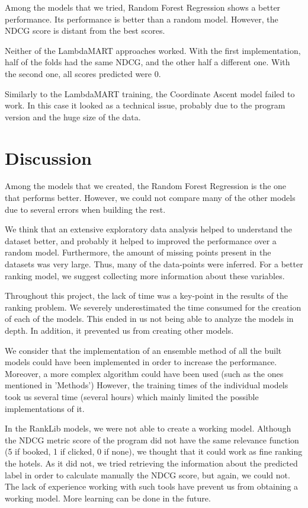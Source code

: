 \documentclass[9pt]{llncs}
\begin{document}
Among the models that we tried, Random Forest Regression shows a better performance. Its performance is better than a random model. However, the NDCG score is distant from the best scores. 


Neither of the LambdaMART approaches worked. With the first implementation, half of the folds had the same NDCG, and the other half a different one. With the second one, all scores predicted were 0.


Similarly to the LambdaMART training, the Coordinate Ascent model failed to work. In this case it looked as a technical issue, probably due to the program version and the huge size of the data.

\section{Discussion}
Among the models that we created, the Random Forest Regression is the one that performs better. However, we could not compare many of the other models due to several errors when building the rest.

We think that an extensive exploratory data analysis helped to understand the dataset better, and probably it helped to improved the performance over a random model.
Furthermore, the amount of missing points present in the datasets was very large. Thus, many of the data-points were inferred. For a better ranking model, we suggest collecting more information about these variables.

Throughout this project, the lack of time was a key-point in the results of the ranking problem. We severely underestimated the time consumed for the creation of each of the models. This ended in us not being able to analyze the models in depth. In addition, it prevented us from creating other models.

We consider that the implementation of an ensemble method of all the built models could have been implemented in order to increase the performance. Moreover, a more complex algorithm could have been used (such as the ones mentioned in 'Methods') However, the training times of the individual models took us several time (several hours) which mainly limited the possible implementations of it. 

In the RankLib models, we were not able to create a working model. Although the NDCG metric score of the program did not have the same relevance function (5 if booked, 1 if clicked, 0 if none), we thought that it could work as fine ranking the hotels. As it did not, we tried retrieving the information about the predicted label in order to calculate manually the NDCG score, but again, we could not. The lack of experience working with such tools have prevent us from obtaining a working  model. More learning can be done in the future.
\end{document}

